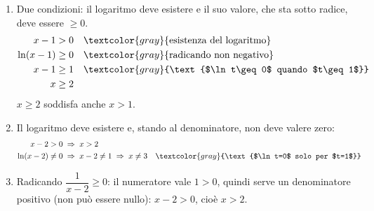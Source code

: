 \begin{question}[ID=1.3, subtitle={Dominio di funzioni con radicali e logaritmi}, difficulty=media, tags={funzioni, dominio}]
\begin{explanation}
\begin{enumerate}
    \item Due condizioni: il logaritmo deve esistere e il suo valore, che sta sotto radice, deve essere $\geq0$.
    \[\begin{aligned}
    x-1 &> 0 && \textcolor{gray}{\text{esistenza del logaritmo}}\\
    \ln(x-1) &\geq 0 && \textcolor{gray}{\text{radicando non negativo}}\\
    x-1 &\geq 1 && \textcolor{gray}{\text{$\ln t\geq0$ quando $t\geq1$}}\\
    x &\geq 2
    \end{aligned}\]
    $x\geq2$ soddisfa anche $x>1$.
    \item Il logaritmo deve esistere e, stando al denominatore, non deve valere zero:
    \[\begin{aligned}
    x-2 &> 0 \;\Rightarrow\; x>2\\
    \ln(x-2) &\neq 0 \;\Rightarrow\; x-2\neq 1 \;\Rightarrow\; x\neq 3 && \textcolor{gray}{\text{$\ln t=0$ solo per $t=1$}}
    \end{aligned}\]
    \item Radicando $\dfrac{1}{x-2}\geq 0$: il numeratore vale $1>0$, quindi serve un denominatore positivo (non può essere nullo): $x-2>0$, cioè $x>2$.
\end{enumerate}
\end{explanation}
\end{question}


